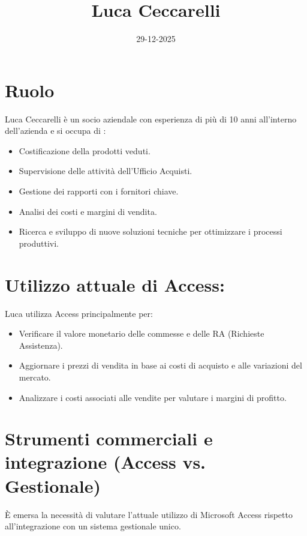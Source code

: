 \documentclass[12pt, a4paper]{article} %
\title{Luca Ceccarelli}
\date{29-12-2025}
\begin{document}
\maketitle

\section{Ruolo} 
Luca Ceccarelli è un socio aziendale con esperienza di più di 10 anni all'interno dell'azienda e si occupa di :
\begin{itemize}
    \item Costificazione della prodotti veduti.
    \item Supervisione delle attività dell'Ufficio Acquisti.
    \item Gestione dei rapporti con i fornitori chiave.
    \item Analisi dei costi e margini di vendita.
    \item Ricerca e sviluppo di nuove soluzioni tecniche per ottimizzare i processi produttivi.
\end{itemize}

\section{Utilizzo attuale di Access:}
Luca utilizza Access principalmente per:
\begin{itemize}
    \item Verificare il valore monetario delle commesse e delle RA (Richieste Assistenza).
    \item Aggiornare i prezzi di vendita in base ai costi di acquisto e alle variazioni del mercato.
    \item Analizzare i costi associati alle vendite per valutare i margini di profitto.
\end{itemize}

\section{Strumenti commerciali e integrazione (Access vs. Gestionale)}
È emersa la necessità di valutare l'attuale utilizzo di Microsoft Access rispetto all'integrazione con un sistema gestionale unico.
\end{document}

